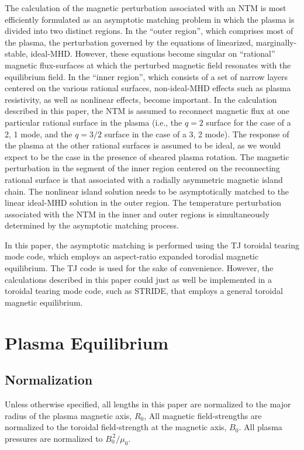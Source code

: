 \documentclass[12pt,prb,aps]{revtex4-1}
\begin{document}
The calculation of the  magnetic perturbation associated with an NTM is most efficiently formulated as an asymptotic matching problem in which the  plasma is  divided into two distinct regions.\cite{tear1,tear2,tear3,tear4,tear5,tear6,tear7,tear8,tear9,tear10}    In the ``outer region'', which comprises most
of the plasma, the perturbation governed by the equations of linearized, marginally-stable, ideal-MHD.
However, these equations become singular on   ``rational'' magnetic flux-surfaces at which the perturbed magnetic field resonates with the equilibrium field. In the ``inner region'', which
consists of a set of narrow layers centered on the various rational surfaces, non-ideal-MHD effects such as plasma resistivity, as well as nonlinear effects,  become important. 
 In the calculation described in this paper, the NTM is assumed to reconnect magnetic flux at one particular rational surface in the plasma (i.e., the
 $q=2$ surface for the case of a 2, 1 mode, and the $q=3/2$ surface in the case of a 3, 2 mode). The response of the plasma at the
 other rational surfaces is assumed to be ideal, as we would expect to be the case in the presence of sheared plasma rotation.\cite{tear5}
The magnetic perturbation in the segment of the inner region centered on the reconnecting rational surface is that associated with a radially asymmetric magnetic island chain.\cite{ntm1,island}
The nonlinear island solution needs to be asymptotically matched to the linear ideal-MHD solution in the outer region. The
temperature perturbation associated with the NTM in the inner and outer regions is simultaneously  determined by the asymptotic matching process. 

In this paper, the asymptotic matching is performed using the TJ toroidal tearing mode code,\cite{tear9,tear10}  which employs an aspect-ratio
expanded torodial magnetic equilibrium.\cite{exp} The TJ code is used for the sake of convenience. However, the calculations described in this paper
could just as well be implemented in a toroidal tearing mode code, such as STRIDE,\cite{tear7,tear8} that employs a general toroidal magnetic 
equilibrium. 

\section{Plasma Equilibrium}
\subsection{Normalization}\label{norm}
Unless otherwise specified, all lengths in this paper are normalized to  the major radius of the plasma magnetic axis, $R_0$, All  magnetic field-strengths
are normalized to the  toroidal field-strength at the magnetic axis, $B_0$. All plasma pressures are normalized to $B_0^{\,2}/\mu_0$.
\end{document}
